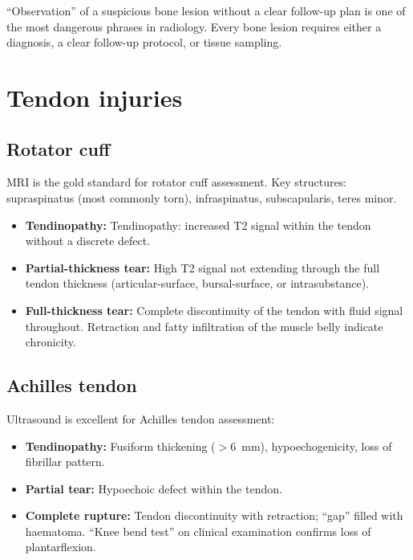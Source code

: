 \begin{pearlbox}
``Observation'' of a suspicious bone lesion without a clear follow-up plan is one of the most dangerous phrases in radiology. Every bone lesion requires either a diagnosis, a clear follow-up protocol, or tissue sampling.
\end{pearlbox}

\section{Tendon injuries}

\subsection{Rotator cuff}
MRI is the gold standard for rotator cuff assessment. Key structures: supraspinatus (most commonly torn), infraspinatus, subscapularis, teres minor.
\begin{itemize}
    \item \textbf{Tendinopathy:} Tendinopathy: increased T2 signal within the tendon without a discrete defect.
    \item \textbf{Partial-thickness tear:} High T2 signal not extending through the full tendon thickness (articular-surface, bursal-surface, or intrasubstance).
    \item \textbf{Full-thickness tear:} Complete discontinuity of the tendon with fluid signal throughout. Retraction and fatty infiltration of the muscle belly indicate chronicity.
\end{itemize}

\subsection{Achilles tendon}
Ultrasound is excellent for Achilles tendon assessment:
\begin{itemize}
    \item \textbf{Tendinopathy:} Fusiform thickening ($>$6~mm), hypoechogenicity, loss of fibrillar pattern.
    \item \textbf{Partial tear:} Hypoechoic defect within the tendon.
    \item \textbf{Complete rupture:} Tendon discontinuity with retraction; ``gap'' filled with haematoma. ``Knee bend test'' on clinical examination confirms loss of plantarflexion.
\end{itemize}

